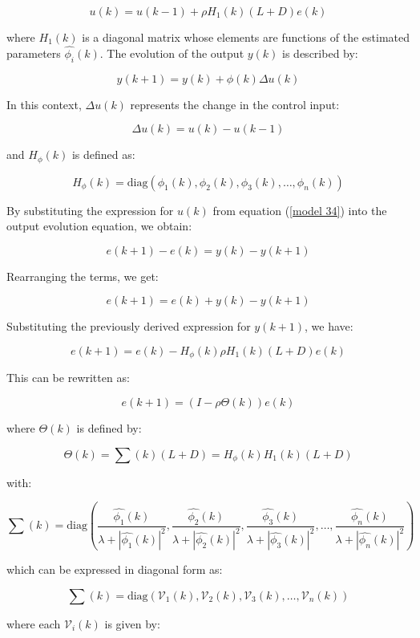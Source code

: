 \documentclass[journal,onecolumn]{IEEEtran}
\begin{document}
\begin{equation}
    \label{model 34}
    u(k) = u(k-1) + \rho H_1(k) (L + D) e(k)
\end{equation}

where \(H_1(k)\) is a diagonal matrix whose elements are functions of the estimated parameters \(\hat{\phi_i}(k)\). The evolution of the output \(y(k)\) is described by:

\[
y(k+1) = y(k) + \phi(k) \Delta u(k)
\]

In this context, \(\Delta u(k)\) represents the change in the control input:

\[
\Delta u(k) = u(k) - u(k-1)
\]

and \(H_\phi(k)\) is defined as:

\[
H_\phi(k) = \text{diag}(\phi_1(k), \phi_2(k), \phi_3(k), \dots, \phi_n(k))
\]

By substituting the expression for \(u(k)\) from equation (\ref{model 34}) into the output evolution equation, we obtain:

\[
e(k+1) - e(k) = y(k) - y(k+1)
\]

Rearranging the terms, we get:

\[
e(k+1) = e(k) + y(k) - y(k+1)
\]

Substituting the previously derived expression for \(y(k+1)\), we have:

\[
e(k+1) = e(k) - H_\phi(k) \rho H_1(k) (L + D) e(k)
\]

This can be rewritten as:

\begin{equation}
    \label{model 36}
    e(k+1) = (I - \rho \Theta(k)) e(k)
\end{equation}

where \(\Theta(k)\) is defined by:

\[
\Theta(k) = \sum(k) (L + D) = H_\phi(k) H_1(k) (L + D)
\]

with:

\[
\sum(k) = \text{diag}\left(\frac{\hat{\phi_1}(k)}{\lambda + |\hat{\phi_1}(k)|^2}, \frac{\hat{\phi_2}(k)}{\lambda + |\hat{\phi_2}(k)|^2}, \frac{\hat{\phi_3}(k)}{\lambda + |\hat{\phi_3}(k)|^2}, \dots, \frac{\hat{\phi_n}(k)}{\lambda + |\hat{\phi_n}(k)|^2}\right)
\]

which can be expressed in diagonal form as:

\[
\sum(k) = \text{diag}(\mathcal{V}_1(k), \mathcal{V}_2(k), \mathcal{V}_3(k), \dots, \mathcal{V}_n(k))
\]

where each \(\mathcal{V}_i(k)\) is given by:
\end{document}
